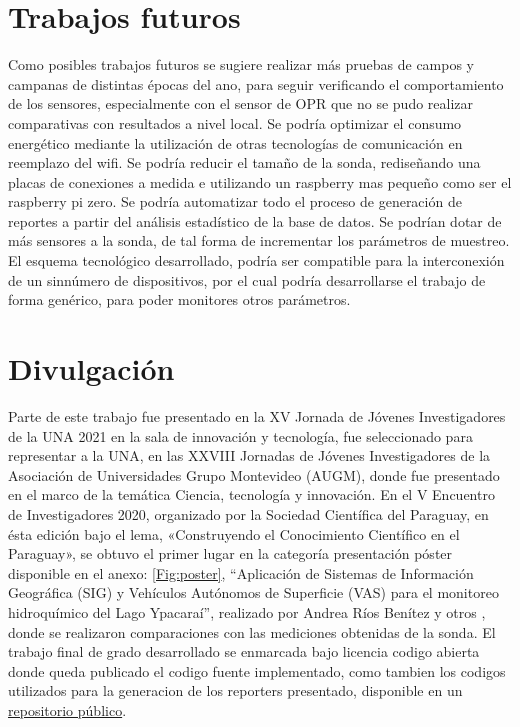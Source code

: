 \section{Trabajos futuros}
Como posibles trabajos futuros se sugiere realizar m\'as pruebas de campos y campanas de distintas épocas del ano, para seguir verificando el comportamiento de los sensores, especialmente con el sensor de OPR que no se pudo realizar comparativas con resultados a nivel local.
Se podría optimizar el consumo energético mediante la utilización de otras tecnologías de comunicación en reemplazo del wifi.
Se podría reducir el tamaño de la sonda, rediseñando una placas de conexiones a medida e utilizando un raspberry mas pequeño como ser el raspberry pi zero.
Se podría automatizar todo el proceso de generación de reportes a partir del análisis estadístico de la base de datos.
Se podrían dotar de m\'as sensores a la sonda, de tal forma de incrementar los parámetros de muestreo.
El esquema tecnológico desarrollado, podría ser compatible para la interconexión de un sinnúmero de dispositivos, por el cual podría desarrollarse el trabajo de forma genérico, para poder monitores otros parámetros.

\section{Divulgaci\'on}
Parte de este trabajo fue presentado en la XV Jornada de Jóvenes Investigadores de la UNA 2021 en la sala de innovación y tecnología, fue seleccionado para representar a la UNA, en las XXVIII Jornadas de Jóvenes Investigadores de la Asociación de Universidades Grupo Montevideo (AUGM), donde fue presentado en el marco de la temática Ciencia, tecnología y innovación. 
En el V Encuentro de Investigadores 2020, organizado por la Sociedad Científica del Paraguay, en ésta edición bajo el lema, «Construyendo el Conocimiento Científico en el Paraguay», se obtuvo el primer lugar en la categoría presentación póster disponible en el anexo: \ref{Fig:poster}, “Aplicación de Sistemas de Información Geográfica (SIG) y Vehículos Autónomos de Superficie (VAS) para el monitoreo hidroquímico del Lago Ypacaraí”, realizado por  Andrea Ríos Benítez y otros , donde se realizaron comparaciones con las mediciones obtenidas de la sonda.
El trabajo final de grado desarrollado se enmarcada bajo licencia codigo abierta donde queda publicado el codigo fuente implementado, como tambien los codigos utilizados para la generacion de los reporters presentado, disponible en un \href{https://github.com/RodPy/FIUNA-LSD-SONDA}{repositorio p\'ublico}.
